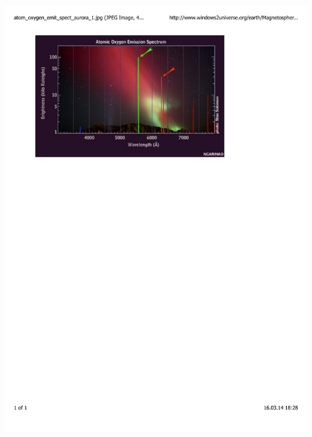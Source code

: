 \documentclass[mathserif,8pt]{beamer}
\begin{document}
\begin{frame}
\begin{columns}
\begin{column}{.30\textwidth}
	\includegraphics[viewport = 80 540 430 800, clip, scale=0.27]{figures/aurora_spectrum.pdf}
    \end{column}
    \end{columns}
\end{frame}
\end{document}
